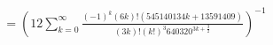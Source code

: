 \documentclass[preview]{standalone}
\begin{document}
\begin{align*}
= (12 \sum_{k=0}^{\infty} \frac{(-1)^k (6k)! (545140134k + 13591409)}{(3k)!(k!)^3 640320^{3k + \frac{3}{2}}})^{-1}
\end{align*}
\end{document}
